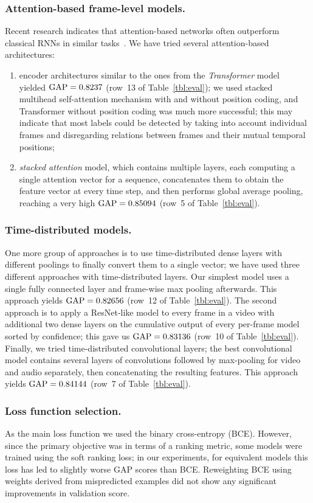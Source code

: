 \documentclass[runningheads]{llncs}
\begin{document}
\subsubsection*{Attention-based frame-level models.}
Recent research indicates that attention-based networks often outperform classical RNNs in similar tasks~\cite{NIPS2017_7181}. We have tried several attention-based architectures:
\begin{enumerate}[(1)]
\item encoder architectures similar to the ones from the \emph{Transformer} model~\cite{vaswani2017attention} yielded $\mathrm{GAP} = 0.8237$ (row~13 of Table~\ref{tbl:eval}); we used stacked multihead self-attention mechanism with and without position coding, and Transformer without position coding was much more successful; this may indicate that most labels could be detected by taking into account individual frames and disregarding relations between frames and their mutual temporal positions;
\item \emph{stacked attention} model, which contains multiple layers, each computing a single attention vector for a sequence, concatenates them to obtain the feature vector at every time step, and then performs global average pooling, reaching a very high $\mathrm{GAP} = 0.85094$ (row~5 of Table~\ref{tbl:eval}).
\end{enumerate}\subsubsection*{Time-distributed models.}
One more group of approaches is to use time-distributed dense layers with different poolings to finally convert them to a single vector; we have used three different approaches with time-distributed layers. Our simplest model uses a single fully connected layer and frame-wise max pooling afterwards. This approach yields $\mathrm{GAP}=0.82656$ (row~12 of Table~\ref{tbl:eval}). 
The second approach is to apply a ResNet-like model to every frame in a video with additional two dense layers on the cumulative output of every per-frame model sorted by confidence; this gave us $\mathrm{GAP}=0.83136$ (row~10 of Table~\ref{tbl:eval}).
Finally, we tried time-distributed convolutional layers; the best convolutional model contains several layers of convolutions followed by max-pooling for video and audio separately, then concatenating the resulting features. This approach yields $\mathrm{GAP}=0.84144$ (row~7 of Table~\ref{tbl:eval}).

\subsubsection*{Loss function selection.}
As the main loss function we used the binary cross-entropy (BCE). However, since the primary objective was in terms of a ranking metric, some models were trained using the soft ranking loss; in our experiments, for equivalent models this loss has led to slightly worse GAP scores than BCE. Reweighting BCE using weights derived from mispredicted examples did not show any significant improvements in validation score.
\end{document}
